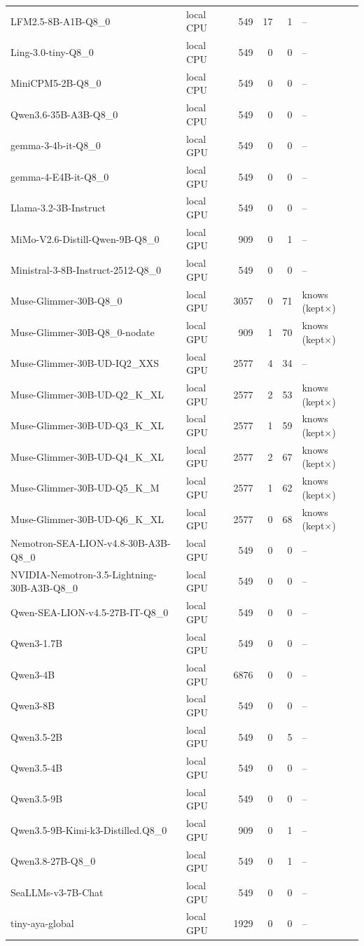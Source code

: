 \begin{tabular}{@{}l l r r r l@{}}
LFM2.5-8B-A1B-Q8\_0 & local CPU & 549 & 17 & 1 & -- \\
Ling-3.0-tiny-Q8\_0 & local CPU & 549 & 0 & 0 & -- \\
MiniCPM5-2B-Q8\_0 & local CPU & 549 & 0 & 0 & -- \\
Qwen3.6-35B-A3B-Q8\_0 & local CPU & 549 & 0 & 0 & -- \\
gemma-3-4b-it-Q8\_0 & local GPU & 549 & 0 & 0 & -- \\
gemma-4-E4B-it-Q8\_0 & local GPU & 549 & 0 & 0 & -- \\
Llama-3.2-3B-Instruct & local GPU & 549 & 0 & 0 & -- \\
MiMo-V2.6-Distill-Qwen-9B-Q8\_0 & local GPU & 909 & 0 & 1 & -- \\
Ministral-3-8B-Instruct-2512-Q8\_0 & local GPU & 549 & 0 & 0 & -- \\
Muse-Glimmer-30B-Q8\_0 & local GPU & 3057 & 0 & 71 & knows (kept$\times$) \\
Muse-Glimmer-30B-Q8\_0-nodate & local GPU & 909 & 1 & 70 & knows (kept$\times$) \\
Muse-Glimmer-30B-UD-IQ2\_XXS & local GPU & 2577 & 4 & 34 & -- \\
Muse-Glimmer-30B-UD-Q2\_K\_XL & local GPU & 2577 & 2 & 53 & knows (kept$\times$) \\
Muse-Glimmer-30B-UD-Q3\_K\_XL & local GPU & 2577 & 1 & 59 & knows (kept$\times$) \\
Muse-Glimmer-30B-UD-Q4\_K\_XL & local GPU & 2577 & 2 & 67 & knows (kept$\times$) \\
Muse-Glimmer-30B-UD-Q5\_K\_M & local GPU & 2577 & 1 & 62 & knows (kept$\times$) \\
Muse-Glimmer-30B-UD-Q6\_K\_XL & local GPU & 2577 & 0 & 68 & knows (kept$\times$) \\
Nemotron-SEA-LION-v4.8-30B-A3B-Q8\_0 & local GPU & 549 & 0 & 0 & -- \\
NVIDIA-Nemotron-3.5-Lightning-30B-A3B-Q8\_0 & local GPU & 549 & 0 & 0 & -- \\
Qwen-SEA-LION-v4.5-27B-IT-Q8\_0 & local GPU & 549 & 0 & 0 & -- \\
Qwen3-1.7B & local GPU & 549 & 0 & 0 & -- \\
Qwen3-4B & local GPU & 6876 & 0 & 0 & -- \\
Qwen3-8B & local GPU & 549 & 0 & 0 & -- \\
Qwen3.5-2B & local GPU & 549 & 0 & 5 & -- \\
Qwen3.5-4B & local GPU & 549 & 0 & 0 & -- \\
Qwen3.5-9B & local GPU & 549 & 0 & 0 & -- \\
Qwen3.5-9B-Kimi-k3-Distilled.Q8\_0 & local GPU & 909 & 0 & 1 & -- \\
Qwen3.8-27B-Q8\_0 & local GPU & 549 & 0 & 1 & -- \\
SeaLLMs-v3-7B-Chat & local GPU & 549 & 0 & 0 & -- \\
tiny-aya-global & local GPU & 1929 & 0 & 0 & -- \\
\bottomrule
\end{tabular}
